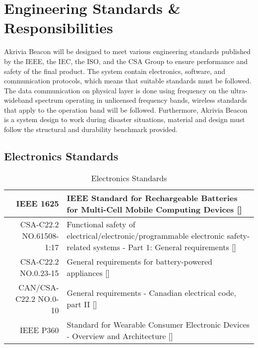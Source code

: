 %

\setcounter{section}{3}
\section{Engineering Standards \& Responsibilities}
\bigskip
Akrivia Beacon will be designed to meet various engineering standards published by the IEEE, the IEC, the ISO, and the CSA Group to ensure performance and safety of the final product. The system contain electronics, software, and communication protocols, which means that suitable standards must be followed. The data communication on physical layer is done using frequency on the ultra-wideband spectrum operating in unlicensed frequency bands, wireless standards that apply to the operation band will be followed. Furthermore, Akrivia Beacon is a system design to work during disaster situations, material and design must follow the structural and durability benchmark provided. 


\subsection{Electronics Standards}
\bgroup
\def\arraystretch{1.5}
\begin{table}[H]
\centering
\begin{tabular}{ | m{3cm} | m{11cm}| } 
\hline
\multicolumn{1}{|r|}{IEEE 1625} & IEEE Standard for Rechargeable Batteries for Multi-Cell Mobile Computing Devices []\\ 
\hline
\multicolumn{1}{|r|}{CSA-C22.2 NO.61508-1:17} & Functional safety of electrical/electronic/programmable electronic safety-related systems - Part 1: General requirements []\\ 
\hline
\multicolumn{1}{|r|}{CSA-C22.2 NO.0.23-15} & General requirements for battery-powered appliances []\\  
\hline
\multicolumn{1}{|r|}{CAN/CSA-C22.2 NO.0-10} & General requirements - Canadian electrical code, part II []\\  
\hline
\multicolumn{1}{|r|}{IEEE P360} & Standard for Wearable Consumer Electronic Devices - Overview and Architecture [] \\  
\hline
\end{tabular}
\caption{Electronics Standards}
\end{table}	
\medskip


